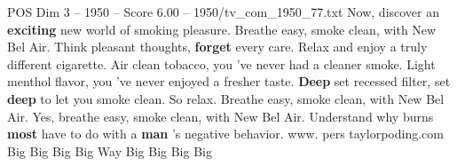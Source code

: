 \begin{textsample}{POS Dim 3 – 1950 – Score 6.00 – 1950/tv\_com\_1950\_77.txt}  \label{ex:f3_pos_006}
Now, discover an \textbf{exciting} new world of smoking pleasure.
Breathe easy, smoke clean, with New Bel Air.
Think pleasant thoughts, \textbf{forget} every care.
Relax and enjoy a truly different cigarette.
Air clean tobacco, you 've never had a cleaner smoke.
Light menthol flavor, you 've never enjoyed a fresher taste. \textbf{Deep} set recessed filter, set \textbf{deep} to let you smoke clean.
So relax.
Breathe easy, smoke clean, with New Bel Air.
Yes, breathe easy, smoke clean, with New Bel Air.
Understand why burns \textbf{most} have to do with a \textbf{man} 's negative behavior. www. pers taylorpoding.com Big Big Big Big Way Big Big Big Big

\end{textsample}
